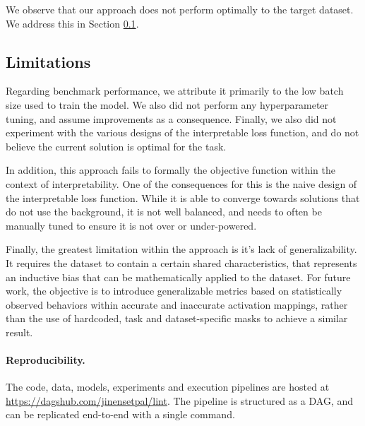 \documentclass{article} %
\begin{document}
We observe that our approach does not perform optimally to the target dataset. We address this in Section \ref{limitations}. 

\subsection{Limitations}
\label{limitations}

Regarding benchmark performance, we attribute it primarily to the low batch size used to train the model. We also did not perform any hyperparameter tuning, and assume improvements as a consequence. Finally, we also did not experiment with the various designs of the interpretable loss function, and do not believe the current solution is optimal for the task.

In addition, this approach fails to formally the objective function within the context of interpretability. One of the consequences for this is the naive design of the interpretable loss function. While it is able to converge towards solutions that do not use the background, it is not well balanced, and needs to often be manually tuned to ensure it is not over or under-powered.

Finally, the greatest limitation within the approach is it's lack of generalizability. It requires the dataset to contain a certain shared characteristics, that represents an inductive bias that can be mathematically applied to the dataset. For future work, the objective is to introduce generalizable metrics based on statistically observed behaviors within accurate and inaccurate activation mappings, rather than the use of hardcoded, task and dataset-specific masks to achieve a similar result.

\paragraph{Reproducibility.} The code, data, models, experiments and execution pipelines are hosted at \url{https://dagshub.com/jinensetpal/lint}. The pipeline is structured as a DAG, and can be replicated end-to-end with a single command.



\end{document}
